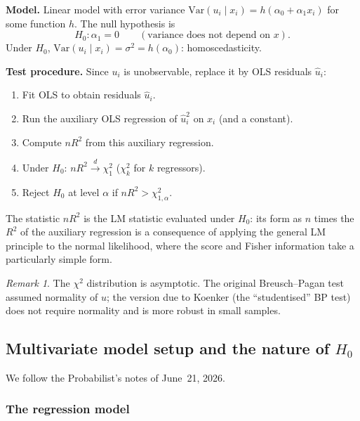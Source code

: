 \documentclass[a4paper,oneside,12pt]{extarticle}
\theoremstyle{plain}
\theoremstyle{definition}
\theoremstyle{remark}
\newtheorem{remark}[proposition]{Remark}
\newcommand*{\Var}{\mathrm{Var}}
\begin{document}
\textbf{Model.} Linear model with error variance
$\Var(u_i \mid x_i) = h(\alpha_0 + \alpha_1 x_i)$
for some function $h$.  The null hypothesis is
\[
  H_0: \alpha_1 = 0
  \qquad (\text{variance does not depend on }x).
\]
Under $H_0$, $\Var(u_i\mid x_i)=\sigma^2=h(\alpha_0)$: homoscedasticity.

\textbf{Test procedure.}
Since $u_i$ is unobservable, replace it by OLS residuals $\hat u_i$:
\begin{enumerate}[label=\arabic*.]
  \item Fit OLS to obtain residuals $\hat u_i$.
  \item Run the auxiliary OLS regression of $\hat u_i^2$ on $x_i$
    (and a constant).
  \item Compute $nR^2$ from this auxiliary regression.
  \item Under $H_0$: $nR^2 \xrightarrow{d} \chi^2_1$
    ($\chi^2_k$ for $k$ regressors).
  \item Reject $H_0$ at level $\alpha$ if $nR^2 > \chi^2_{1,\alpha}$.
\end{enumerate}

The statistic $nR^2$ is the LM statistic evaluated under $H_0$:
its form as $n$ times the $R^2$ of the auxiliary regression is a
consequence of applying the general LM principle to the normal
likelihood, where the score and Fisher information take a
particularly simple form.

\begin{remark}
The $\chi^2$ distribution is asymptotic. The original Breusch--Pagan
test assumed normality of $u$; the version due to Koenker (the
``studentised'' BP test) does not require normality and is more
robust in small samples.
\end{remark}


\subsection{Multivariate model setup and the nature of \texorpdfstring{$H_0$}{H0}}
\label{subsec:bp-setup}

We follow the Probabilist's notes of June~21, 2026.

\subsubsection*{The regression model}
\end{document}
